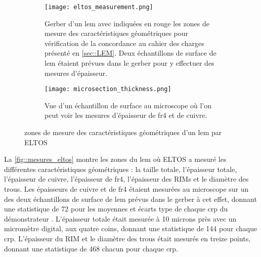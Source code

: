         \begin{figure}[!htb]
          \begin{subfigure}[t]{0.68\textwidth}
            \texttt{[image: eltos\_measurement.png]}
            \caption{Gerber d'un \gls{lem} avec indiquées en rouge les zones de mesure des caractéristiques géométriques pour vérification de la concordance au cahier des charges présenté en \autoref{sec::LEM}. Deux échantillons de surface de \gls{lem} étaient prévues dans le gerber pour y effectuer des mesures d'épaisseur.}
          \end{subfigure}
          \hfill
          \begin{subfigure}[t]{0.3\textwidth}
            \texttt{[image: microsection\_thickness.png]}
            \caption{\label{fig::microsection}Vue d'un échantillon de surface au microscope où l'on peut voir les mesures d'épaisseur de \gls{fr4} et de cuivre.}
          \end{subfigure}
          \caption[Zones de mesuredes caractéristiques géométriques d'un LEM par ELTOS]{\label{fig::mesures_eltos}zones de mesure des caractéristiques géométriques d'un \gls{lem} par ELTOS}
        \end{figure}
            
        La \autoref{fig::mesures_eltos} montre les zones du \gls{lem} où ELTOS a mesuré les différentes caractéristiques géométriques : la taille totale, l'épaisseur totale, l'épaisseur de cuivre, l'épaisseur de \gls{fr4}, l'épaisseur des RIMs et le diamètre des trous. Les épaisseurs de cuivre et de \gls{fr4} étaient mesurées au microscope sur un des deux échantillons de surface de \gls{lem} prévus dans le gerber à cet effet, donnant une statistique de 72 pour les moyennes et écarts type de chaque \gls{crp} du démonstrateur \SSS{}. L'épaisseur totale était mesurée à 10 microns près avec un micromètre digital, aux quatre coins, donnant une statistique de 144 pour chaque \gls{crp}. L'épaisseur du RIM et le diamètre des trous était mesurés en treize points, donnant une statistique de 468 chacun pour chaque \gls{crp}.
                
                
